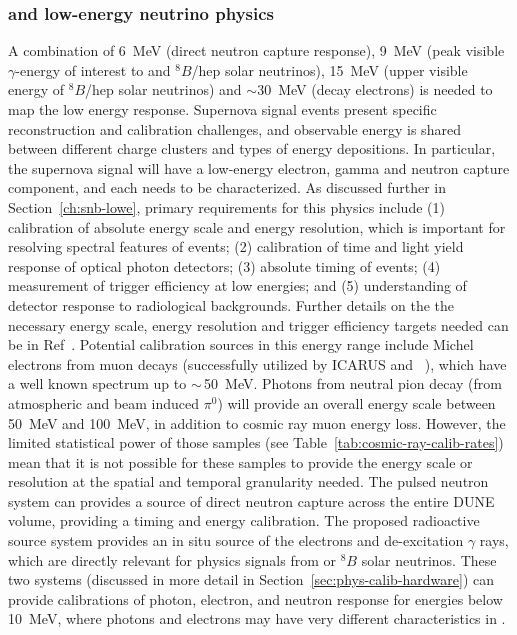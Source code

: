 \subsubsection{ and low-energy neutrino physics}
A combination of 6~MeV (direct neutron capture response), 9~MeV (peak visible $\gamma$-energy of interest to  and $^{8}B$/hep solar neutrinos), 15~MeV (upper visible energy of $^{8}B$/hep solar neutrinos) and $\sim$30~MeV (decay electrons) is needed to map the low energy response. Supernova signal events present specific reconstruction and calibration challenges, and observable energy is shared between different charge clusters and types of energy depositions. In particular, the supernova signal will have a low-energy electron, gamma and neutron capture component, and each needs to be characterized. As discussed further in Section~\ref{ch:snb-lowe}, primary requirements for this physics include 
(1) calibration of absolute energy scale and energy resolution, which is important for resolving spectral features of  events;
(2) calibration of time and light yield response of optical photon detectors;  
(3) absolute timing of events;  
(4) measurement of trigger efficiency at low energies;  and 
(5) understanding of detector response to radiological backgrounds. Further details on the the necessary energy scale, energy resolution and trigger efficiency targets needed can be in Ref~\cite{bib:docdb14068}.
Potential calibration sources in this energy range include Michel electrons from muon decays (successfully utilized by ICARUS and ~\cite{Acciarri:2017sjy}), which have a well known spectrum up to $\sim\,$\SI{50}{\MeV}.
Photons from neutral pion decay (from atmospheric and beam induced $\pi^0$) will provide an overall energy scale between \SI{50}{\MeV} and \SI{100}{\MeV}, in addition to cosmic ray muon energy loss. 
However, the limited statistical power of those samples (see Table~\ref{tab:cosmic-ray-calib-rates}) mean that it is not possible for these samples to provide the energy scale or resolution at the spatial and temporal granularity needed.
The pulsed neutron system can provides a source of direct neutron capture across the entire DUNE volume, providing a timing and energy calibration.
The proposed radioactive source system provides an in situ source of the electrons and de-excitation $\gamma$ rays, which are directly relevant for physics signals from  or $^{8}B$ solar neutrinos. These two systems (discussed in more detail in Section~\ref{sec:phys-calib-hardware}) can provide calibrations of photon, electron, and neutron response for energies below \SI{10}{\MeV}, where photons and electrons may have very different characteristics in .
